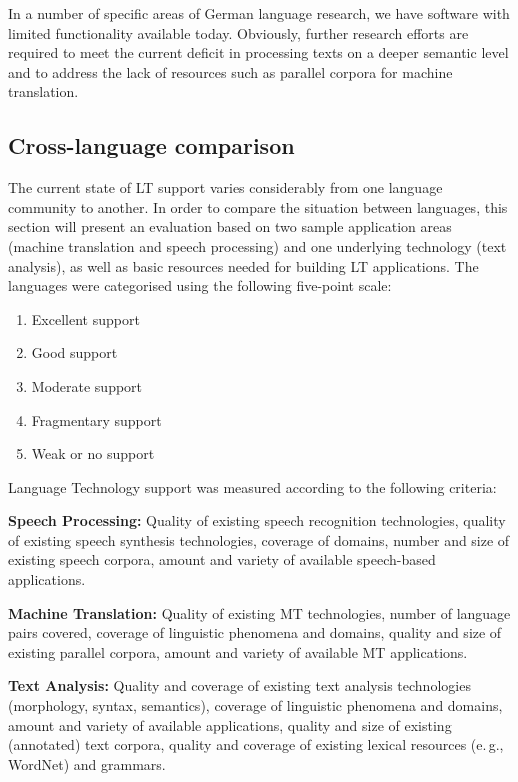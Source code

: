 \documentclass[]{../../metanetpaper}
\begin{document}
\begin{multicols}{2}
In a number of specific areas of German language research, we have software with limited functionality available today. Obviously, further research efforts are required to meet the current deficit in processing texts on a deeper semantic level and to address the lack of resources such as parallel corpora for machine translation.

\subsection{Cross-language comparison}

The current state of LT support varies considerably from one language community to another. In order to compare the situation between languages, this section will present an evaluation based on two sample application areas (machine translation and speech processing) and one underlying technology (text analysis), as well as basic resources needed for building LT applications. The languages were categorised using the following five-point scale: 

\begin{enumerate}
\item Excellent support
\item Good support
\item Moderate support
\item Fragmentary support
\item Weak or no support
\end{enumerate}

Language Technology support was measured according to the following criteria:

\textbf{Speech Processing:} Quality of existing speech recognition technologies, quality of existing speech synthesis technologies, coverage of domains, number and size of existing speech corpora, amount and variety of available speech-based applications.

\textbf{Machine Translation:} Quality of existing MT technologies, number of language pairs covered, coverage of linguistic phenomena and domains, quality and size of existing parallel corpora, amount and variety of available MT applications.

\textbf{Text Analysis:} Quality and coverage of existing text analysis technologies (morphology, syntax, semantics), coverage of linguistic phenomena and domains, amount and variety of available applications, quality and size of existing (annotated) text corpora, quality and coverage of existing lexical resources (e.\,g., WordNet) and grammars.


\end{multicols}
\end{document}

